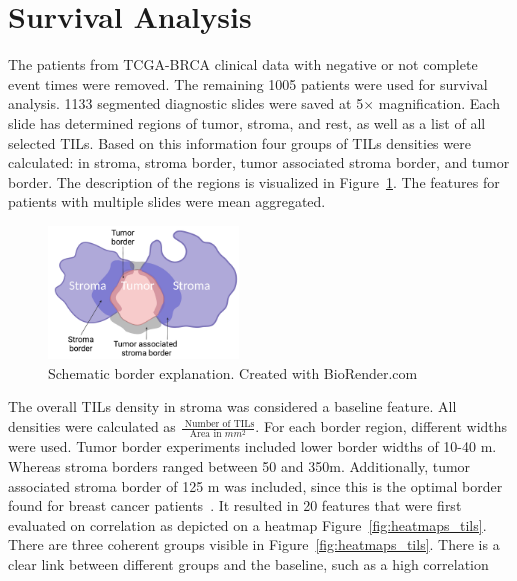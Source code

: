 \section{Survival Analysis}
The patients from TCGA-BRCA clinical data with negative or not complete event times were removed. The remaining
1005 patients were used for survival analysis.
1133 segmented diagnostic slides were saved at 5$\times$ magnification. Each slide has determined regions of tumor, stroma,
and rest, as well as a list of all selected TILs. Based on this information four groups of TILs
densities were calculated: in stroma, stroma border, tumor associated stroma border,
and tumor border. The description of the regions is visualized in Figure~\ref*{fig:borders}.
The features for patients with multiple slides were mean aggregated.
\begin{figure}
    \centering
    \includegraphics[width=0.45\textwidth]{figures/survival/tils_scheme.png} 
    \caption{Schematic border explanation. Created with BioRender.com}
    \label{fig:borders} 
\end{figure}
The overall TILs density in stroma was considered a baseline feature.
All densities were calculated as $\frac{\textrm{ Number of TILs}}{\textrm{Area in } mm^2}$.
For each border region, different widths were used. Tumor border experiments included
lower border widths of 10-40 \textmu m. Whereas stroma borders ranged between 50
and 350\textmu m.
Additionally, tumor associated stroma border of 125 \textmu m was included, since this is
the optimal border found for breast cancer patients~\cite{thagaard2021automated}.
It resulted in 20 features
that were first evaluated on correlation as depicted on a heatmap Figure~\ref{fig:heatmaps_tils}.
There are three coherent groups visible in Figure~\ref{fig:heatmaps_tils}.
There is a clear link between different groups and the baseline, such as a high correlation
